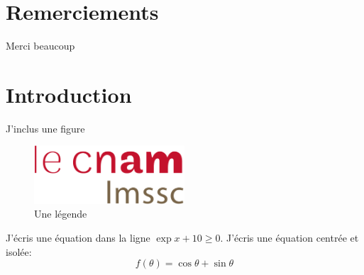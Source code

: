 \documentclass[10pt]{article}
\begin{document}

\maketitle
\newpage
\setlength{\abovedisplayskip}{6pt}
\setlength{\belowdisplayskip}{6pt}

\pagestyle{intro}
\tableofcontents
\newpage
\listoffigures
\listoftables
\clearpage
\newpage
\section*{Remerciements}
Merci beaucoup
%
\pagestyle{plain}
\newpage
%	
\section{Introduction}

J'inclus une figure
\begin{figure}[htp!]
\centering
\includegraphics[width=0.5\textwidth]{LOGO_LMSSC}
\caption{Une légende}
\label{unlabel}
\end{figure}


J'écris une équation dans la ligne \(\exp x+10\geq0\).
J'écris une équation centrée et isolée:
\begin{equation}
	f(\theta)=\cos\theta+\sin\theta
	\label{unautrelabel}
\end{equation}
\end{document}
